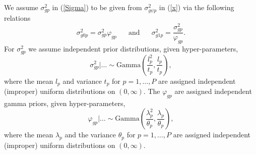 \documentclass[11pt]{article}
\begin{document}
We assume $\sigma^2_{gp}$ in (\ref{Sigma}) to be given from $\sigma^2_{g\psi p}$ in 
(\ref{x}) via the following relations
\begin{equation}
\sigma^2_{g0p} = \sigma^2_{gp} \varphi_{gp} \mbox{~~~~~and~~~~~}
\sigma^2_{g1p} = \frac{\sigma^2_{gp}} {\varphi_{gp}}.
\end{equation}
For $\sigma^2_{gp}$ we assume independent prior distributions, given hyper-parameters,
\begin{equation}
\sigma^2_{gp}|\ldots \sim \mbox{Gamma}\left(\frac{l_p^2}{t_p},\frac{l_p}{t_p}\right),
\end{equation}
where the mean $l_p$ and variance $t_p$ for $p=1,\ldots,P$ are assigned independent (improper) uniform
distributions on $(0,\infty)$.
The $\varphi_{gp}$ are assigned independent gamma priors, given hyper-parameters,
\begin{equation}
\varphi_{gp}|\ldots \sim \mbox{Gamma}\left(\frac{\lambda_p^2}{\theta_p},\frac{\lambda_p}{\theta_p}\right),
\end{equation}
where the mean $\lambda_p$ and the variance $\theta_p$ for $p=1,\ldots,P$ are assigned independent (improper) uniform
distributions on $(0,\infty)$.
\end{document}
